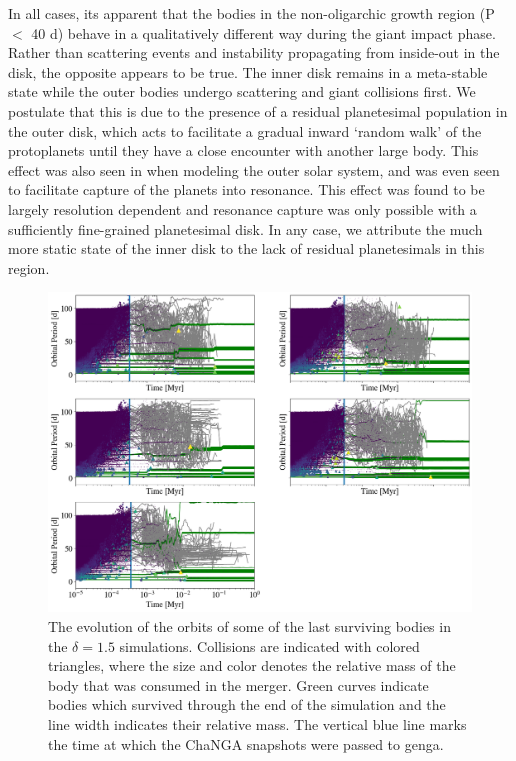 In all cases, its apparent that the bodies in the non-oligarchic growth region (P $<$ 40 d) behave in a qualitatively different way during the giant impact phase. Rather than scattering events and instability propagating from inside-out in the disk, the opposite appears to be true. The inner disk remains in a meta-stable state while the outer bodies undergo scattering and giant collisions first. We postulate that this is due to the presence of a residual planetesimal population in the outer disk, which acts to facilitate a gradual inward `random walk' of the protoplanets until they have a close encounter with another large body. This effect was also seen in \cite{murrayclay06} when modeling the outer solar system, and was even seen to facilitate capture of the planets into resonance. This effect was found to be largely resolution dependent and resonance capture was only possible with a sufficiently fine-grained planetesimal disk. In any case, we attribute the much more static state of the inner disk to the lack of residual planetesimals in this region.

\begin{figure}
\begin{center}
    \includegraphics[width=\textwidth]{figures/stip/full_coll_evo.png}
    \caption{The evolution of the orbits of some of the last surviving bodies in the $\delta = 1.5$ simulations. Collisions are indicated with colored triangles, where the size and color denotes the relative mass of the body that was consumed in the merger. Green curves indicate bodies which survived through the end of the simulation and the line width indicates their relative mass. The vertical blue line marks the time at which the {\sc ChaNGA} snapshots were passed to {\sc genga}.\label{fig:full_coll_evo}}
\end{center}
\end{figure}

